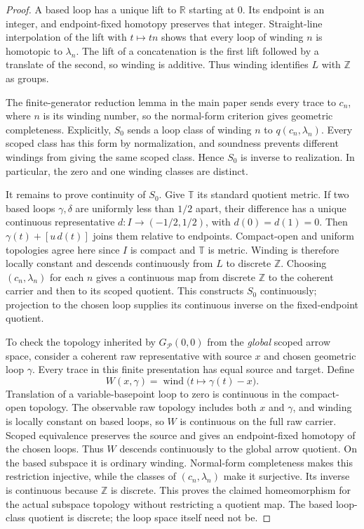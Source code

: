 \documentclass[10pt,reqno]{amsart}
\theoremstyle{definition}
\theoremstyle{plain}
\theoremstyle{remark}
\newcommand{\Z}{\mathbb Z}
\begin{document}
\begin{proof}
A based loop has a unique lift to $\mathbb R$ starting at $0$.
Its endpoint is an integer, and endpoint-fixed homotopy preserves that
integer.  Straight-line interpolation of the lift with $t\mapsto tn$
shows that every loop of winding $n$ is homotopic to $\lambda_n$.
The lift of a concatenation is the first lift followed by a translate of the
second, so winding is additive.  Thus winding identifies $L$ with $\mathbb Z$
as groups.

The finite-generator reduction lemma in the main paper sends every trace to $c_n$, where $n$ is
its winding number, so the normal-form criterion gives geometric
completeness.  Explicitly, $S_0$ sends a loop class of winding $n$ to
$q(c_n,\lambda_n)$.  Every scoped class has this form by normalization,
and soundness prevents different windings from giving the same scoped
class.  Hence $S_0$ is inverse to realization.  In particular, the zero
and one winding classes are distinct.



It remains to prove continuity of $S_0$.  Give $\mathbb T$ its standard
quotient metric.  If two based loops $\gamma,\delta$ are uniformly less
than $1/2$ apart, their difference has a unique continuous representative
$d:I\to(-1/2,1/2)$, with $d(0)=d(1)=0$.
Then $\gamma(t)+[u\,d(t)]$ joins them relative to endpoints.
Compact-open and uniform topologies agree here since $I$ is compact and
$\mathbb T$ is metric.  Winding is therefore locally constant and descends
continuously from $L$ to discrete $\Z$.
Choosing $(c_n,\lambda_n)$ for each $n$ gives a continuous map from
discrete $\Z$ to the coherent carrier and then to its scoped quotient.
This constructs $S_0$ continuously; projection to the chosen loop
supplies its continuous inverse on the fixed-endpoint quotient.

\enlargethispage{2\baselineskip}
To check the topology inherited by $G_{\mathcal P}(0,0)$ from the
\emph{global} scoped arrow space, consider a coherent raw representative
with source $x$ and chosen geometric loop $\gamma$. Every trace in this
finite presentation has equal source and target. Define
\[
  W(x,\gamma)=\operatorname{wind}
    \bigl(t\mapsto\gamma(t)-x\bigr).
\]
Translation of a variable-basepoint loop to zero is continuous in the
compact-open topology. The observable raw topology includes both $x$ and
$\gamma$, and winding is locally constant on based loops, so $W$ is
continuous on the full raw carrier. Scoped equivalence preserves the
source and gives an endpoint-fixed homotopy of the chosen loops. Thus $W$
descends continuously to the global arrow quotient. On the based subspace
it is ordinary winding. Normal-form completeness makes this restriction
injective, while the classes of $(c_n,\lambda_n)$ make it surjective. Its
inverse is continuous because $\mathbb Z$ is discrete. This proves the
claimed homeomorphism for the actual subspace topology without restricting
a quotient map. The based loop-class quotient is discrete; the loop space
itself need not be.
\end{proof}
\end{document}

